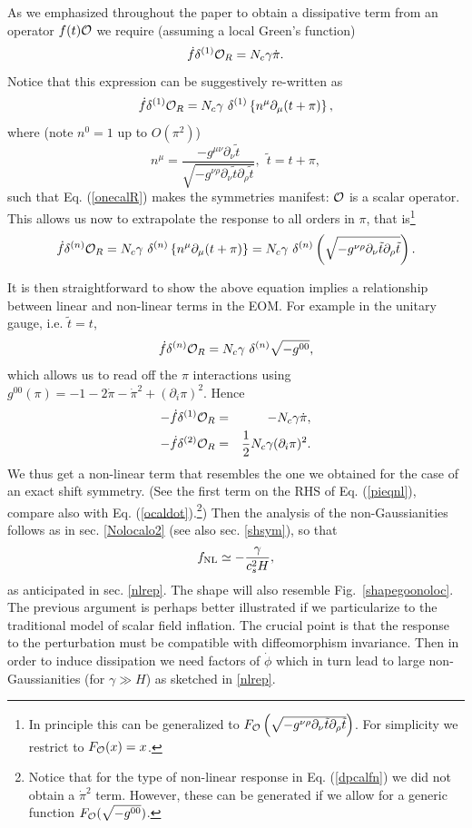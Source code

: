 \documentclass[11pt,amsmath,floats,floatfix,nofootinbib,secnumarabic, superscriptaddress, tightenlines]{revtex4}
\newcommand{\beq}{\begin{equation}}
\newcommand{\eeq}{\end{equation}}
\newcommand{\bea}{\begin{eqnarray}}
\newcommand{\eea}{\end{eqnarray}}
\newcommand{\calo}{{\cal O}}
\begin{document}
{As we emphasized throughout the paper to obtain a dissipative term from an operator $f(t)\calo$ we require (assuming a local Green's function)
\beq
\dot f  \delta^{(1)}\calo_R = N_c \gamma \dot\pi.
\eeq
Notice that this expression can be suggestively re-written as
\beq
\label{onecalR}
\dot f  \delta^{(1)}\calo_R = N_c \gamma~\delta^{(1)}\left\{n^\mu\partial_\mu(t+\pi)\right\},
\eeq
where (note $n^0= 1$ up to $O(\pi^2)$)
\beq
\label{nmu2} n^{\mu}=\frac{-g^{\mu\nu}\partial_{\nu}{\tilde t}}{\sqrt{-g^{\nu\rho}\partial_{\nu}{\tilde t}\partial_{\rho}{\tilde t}}},
~~\tilde t = t+\pi, \eeq   
such that Eq. (\ref{onecalR}) makes the symmetries manifest: $\calo$ is a scalar operator. This allows us now to extrapolate the response to all orders in $\pi$, that is\footnote{In principle this can be generalized to $F_\calo\left(\sqrt{-g^{\nu\rho}\partial_{\nu}{\tilde t}\partial_{\rho}{\tilde t}}\right)$. For simplicity we restrict to $F_\calo(x)=x$.}
\beq
\label{gretto2p}
\dot f  \delta^{(n)}\calo_R = N_c \gamma~\delta^{(n)}\left\{n^\mu\partial_\mu(t+\pi)\right\} = N_c\gamma~\delta^{(n)}\left(\sqrt{-g^{\nu\rho}\partial_{\nu}{\tilde t}\partial_{\rho}{\tilde t}}\right).
\eeq

It is then straightforward to show the above equation implies a relationship between linear and non-linear terms in the EOM. For example in the unitary gauge, i.e. $\tilde t=t$, 
\beq
\label{dpcalfn}
\dot f  \delta^{(n)}\calo_R = N_c \gamma~\delta^{(n)}\sqrt{-g^{00}},
\eeq
which allows us to read off the $\pi$ interactions using $g^{00}(\pi) = -1-2\dot\pi -\dot\pi^2 + (\partial_i\pi)^2$. Hence
\bea
-\dot f \delta^{(1)}\calo_R &=& -N_c \gamma \dot\pi,\\
-\dot f \delta^{(2)}\calo_R &=& \frac{1}{2} N_c \gamma (\partial_i\pi)^2 
\label{dpcalo2}.
\eea
We thus get a non-linear term that resembles the one we obtained for the case of an exact shift symmetry. (See the first term on the RHS of Eq. (\ref{pieqnl}), compare also with Eq. (\ref{ocaldot}).\footnote{Notice that for the type of non-linear response in Eq. (\ref{dpcalfn}) we did not obtain a $\dot\pi^2$ term. However, these can be generated if we allow for a generic function $F_\calo(\sqrt{-g^{00}})$.}) Then the analysis of the non-Gaussianities follows as in sec. \ref{Nolocalo2} (see also sec. \ref{shsym}), so that
\beq
f_{\rm NL} \simeq -\frac{\gamma}{c_s^2 H},
\eeq
as anticipated in sec. \ref{nlrep}. The shape will also resemble Fig.~\ref{shapegoonoloc}.\\

The previous argument is perhaps better illustrated if we particularize to the traditional model of scalar field inflation. The crucial point is that the response to the perturbation must be compatible with diffeomorphism invariance. Then in order to induce dissipation we need factors of $\dot\phi$ which in turn lead to large non-Gaussianities (for $\gamma \gg H$) as sketched in \ref{nlrep}. 

}
\end{document}
